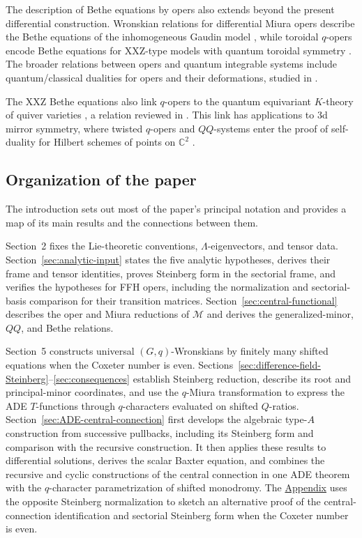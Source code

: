 \documentclass[11pt,leqno]{amsart}
\numberwithin{equation}{section}
\theoremstyle{plain}
\theoremstyle{definition}
\theoremstyle{plain}
\theoremstyle{definition}
\theoremstyle{remark}
\begin{document}
The description of Bethe equations by opers also extends beyond the present differential construction.  Wronskian relations for differential Miura opers describe the Bethe equations of the inhomogeneous Gaudin model \cite{BrinsonSageZeitlin2024}, while toroidal $q$-opers encode Bethe equations for XXZ-type models with quantum toroidal symmetry \cite{KoroteevZeitlinToroidal2023}.  The broader relations between opers and quantum integrable systems include quantum/classical dualities for opers and their deformations, studied in \cite{KoroteevZeitlinZoo2024}.

The XXZ Bethe equations also link $q$-opers to the quantum equivariant $K$-theory of quiver varieties \cite{KSZ2021,KoroteevPushkarSmirnovZeitlin2021}, a relation reviewed in \cite[Sections~3 and~4]{ZeitlinBethe2024}.  This link has applications to 3d mirror symmetry, where twisted $q$-opers and $QQ$-systems enter the proof of self-duality for Hilbert schemes of points on $\mathbb C^2$ \cite{KoroteevZeitlinMirror2023}.

\subsection{Organization of the paper}

The introduction sets out most of the paper's principal notation and provides a map of its main results and the connections between them.

Section~2 fixes the Lie-theoretic conventions, $\Lambda$-eigenvectors, and tensor data.  Section~\ref{sec:analytic-input} states the five analytic hypotheses, derives their frame and tensor identities, proves Steinberg form in the sectorial frame, and verifies the hypotheses for FFH opers, including the normalization and sectorial-basis comparison for their transition matrices.  Section~\ref{sec:central-functional} describes the oper and Miura reductions of $\mathscr M$ and derives the generalized-minor, $QQ$, and Bethe relations.

Section~5 constructs universal $(G,q)$-Wronskians by finitely many shifted equations when the Coxeter number is even.  Sections~\ref{sec:difference-field-Steinberg}--\ref{sec:consequences} establish Steinberg reduction, describe its root and principal-minor coordinates, and use the $q$-Miura transformation to express the ADE $T$-functions through $q$-characters evaluated on shifted $Q$-ratios.  Section~\ref{sec:ADE-central-connection} first develops the algebraic type-$A$ construction from successive pullbacks, including its Steinberg form and comparison with the recursive construction. It then applies these results to differential solutions, derives the scalar Baxter equation, and combines the recursive and cyclic constructions of the central connection in one ADE theorem with the $q$-character parametrization of shifted monodromy.  The \hyperref[sec:opposite-normal-form]{Appendix} uses the opposite Steinberg normalization to sketch an alternative proof of the central-connection identification and sectorial Steinberg form when the Coxeter number is even.
\end{document}
